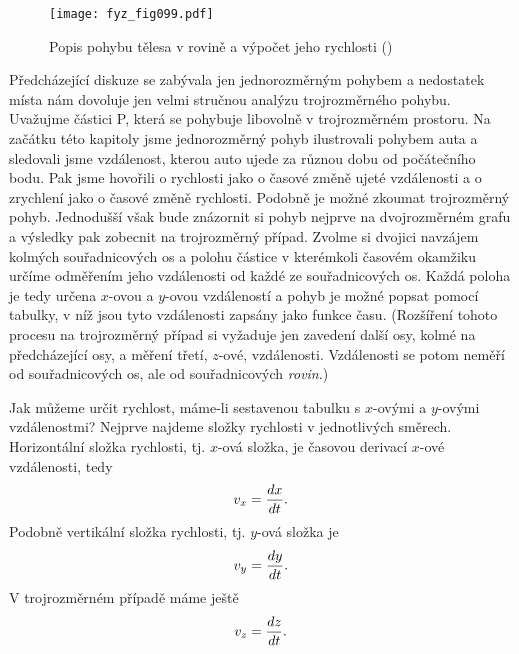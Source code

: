 {    \begin{figure}[ht!]  %
      \centering
      \texttt{[image: fyz\_fig099.pdf]}
      \caption{Popis pohybu tělesa v rovině a výpočet jeho rychlosti
               (\cite[s.~118]{Feynman01})}
      \label{fyz:fig099}
    \end{figure}
    Předcházející diskuze se zabývala jen jednorozměrným pohybem a nedostatek místa nám dovoluje 
    jen velmi stručnou analýzu trojrozměrného pohybu. Uvažujme částici P, která se pohybuje 
    libovolně v trojrozměrném prostoru. Na začátku této kapitoly jsme jednorozměrný pohyb 
    ilustrovali pohybem auta a sledovali jsme vzdálenost, kterou auto ujede za různou dobu od 
    počátečního bodu. Pak jsme hovořili o rychlosti jako o časové změně ujeté vzdálenosti a o 
    zrychlení jako o časové změně rychlosti. Podobně je možné zkoumat trojrozměrný pohyb. 
    Jednodušší však bude znázornit si pohyb nejprve na dvojrozměrném grafu a výsledky pak zobecnit 
    na trojrozměrný případ. Zvolme si dvojici navzájem kolmých souřadnicových os a polohu částice v 
    kterémkoli časovém okamžiku určíme odměřením jeho vzdálenosti od každé ze souřadnicových os. 
    Každá poloha je tedy určena \(x\)-ovou a \(y\)-ovou vzdáleností a pohyb je možné popsat pomocí 
    tabulky, v níž jsou tyto vzdálenosti zapsány jako funkce času. (Rozšíření tohoto procesu na 
    trojrozměrný případ si vyžaduje jen zavedení další osy, kolmé na předcházející osy, a měření 
    třetí, \(z\)-ové, vzdálenosti. Vzdálenosti se potom neměří od souřadnicových os, ale od 
    souřadnicových \emph{rovin}.)
    
    Jak můžeme určit rychlost, máme-li sestavenou tabulku s \(x\)-ovými a \(y\)-ovými vzdálenostmi? 
    Nejprve najdeme složky rychlosti v jednotlivých směrech. Horizontální složka rychlosti, tj. 
    \(x\)-ová složka, je časovou derivací \(x\)-ové vzdálenosti, tedy
    \begin{equation}\label{FYZ:eq106}
      v_x = \dfrac{d x}{d t}.
    \end{equation}
    Podobně vertikální složka rychlosti, tj. \(y\)-ová složka je
    \begin{equation}\label{FYZ:eq108}
      v_y = \dfrac{d y}{d t}.
    \end{equation}
    V trojrozměrném případě máme ještě
    \begin{equation}\label{FYZ:eq107}
      v_z = \dfrac{d z}{d t}.
    \end{equation}
    
}
